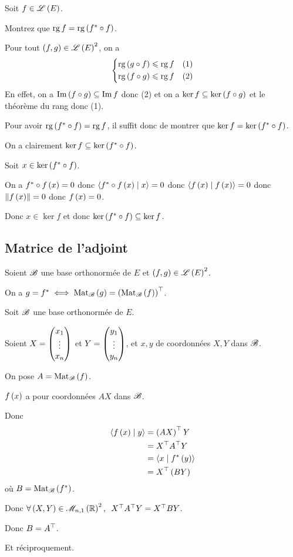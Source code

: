 \begin{exo}
Soit \(f\in\mathscr{L}\left(E\right)\).

Montrez que \(\operatorname{rg} f=\operatorname{rg}\left(f^*\circ f\right)\).
\end{exo}

\begin{corr}
Pour tout \(\left(f,g\right)\in\mathscr{L}\left(E\right)^2\), on a \[\begin{dcases}
\operatorname{rg}\left(g\circ f\right)\leqslant\operatorname{rg} f &\text{(1)} \\
\operatorname{rg}\left(f\circ g\right)\leqslant\operatorname{rg} f &\text{(2)}
\end{dcases}\] En effet, on a \(\operatorname{Im}\left(f\circ g\right)\subseteq\operatorname{Im} f\) donc (2) et on a \(\ker f\subseteq\ker\left(f\circ g\right)\) et le théorème du rang donc (1).

Pour avoir \(\operatorname{rg}\left(f^*\circ f\right)=\operatorname{rg} f\), il suffit donc de montrer que \(\ker f=\ker\left(f^*\circ f\right)\).

On a clairement \(\ker f\subseteq\ker\left(f^*\circ f\right)\).

Soit \(x\in\ker\left(f^*\circ f\right)\).

On a \(f^*\circ f\left(x\right)=0\) donc \(\ps{f\adj\rond f\paren{x}}{x}=0\) donc \(\ps{f\paren{x}}{f\paren{x}}=0\) donc \(\norme{f\paren{x}}=0\) donc \(f\left(x\right)=0\).

Donc \(x\in\ker f\) et donc \(\ker\left(f^*\circ f\right)\subseteq\ker f\).
\end{corr}

\subsection{Matrice de l'adjoint}

\begin{prop}
Soient \(\mathscr{B}\) une base orthonormée de \(E\) et \(\left(f,g\right)\in\mathscr{L}\left(E\right)^2\).

On a \(g=f\adj\ssi\Mat{g}=\trans{\paren{\Mat{f}}}\).
\end{prop}

\begin{dem}
Soit \(\mathscr{B}\) une base orthonormée de \(E\).

Soient \(X=\begin{pmatrix}x_1\\\vdots\\x_n\end{pmatrix}\) et \(Y=\begin{pmatrix}y_1\\\vdots\\y_n\end{pmatrix}\), et \(x,y\) de coordonnées \(X,Y\) dans \(\mathscr{B}\).

On pose \(A=\Mat{f}\).

\(f\left(x\right)\) a pour coordonnées \(AX\) dans \(\mathscr{B}\).

Donc \[\begin{aligned}
\ps{f\paren{x}}{y}&=\trans{\paren{AX}}Y \\
&=\trans{X}\trans{A}Y \\
&=\ps{x}{f\adj\paren{y}} \\
&=\trans{X}\paren{BY}
\end{aligned}\] où \(B=\Mat{f\adj}\).

Donc \(\quantifs{\forall\paren{X,Y}\in\M{n,1}[\R]^2}\trans{X}\trans{A}Y=\trans{X}BY\).

Donc \(B=A^{\top}\).

Et réciproquement.
\end{dem}

